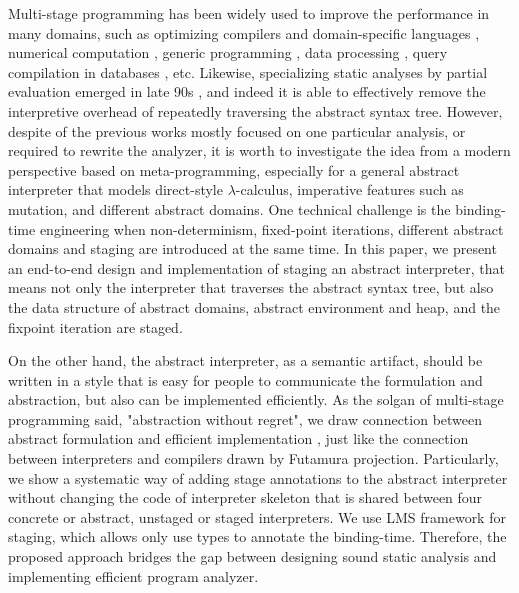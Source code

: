 Multi-stage programming has been widely used to improve the performance in many domains, 
such as optimizing compilers and domain-specific languages \cite{DBLP:conf/pldi/RompfSBLCO14, DBLP:conf/snapl/RompfBLSJAOSKDK15,
DBLP:journals/tecs/SujeethBLRCOO14, DBLP:conf/gpce/SujeethGBLROO13, DBLP:journals/jfp/CaretteKS09},
numerical computation \cite{PGL-038, DBLP:conf/pepm/AktemurKKS13}, 
generic programming \cite{DBLP:journals/pacmpl/Yallop17, Ofenbeck:2017:SGP:3136040.3136060}, 
data processing \cite{DBLP:conf/oopsla/JonnalageddaCSRO14, DBLP:conf/popl/KiselyovBPS17}, 
query compilation in databases \cite{DBLP:conf/osdi/EssertelTDBOR18, DBLP:conf/sigmod/TahboubER18},
etc.
Likewise, specializing static analyses by partial evaluation emerged in late 90s 
\cite{damian1999partial, amtoft1999partial, Boucher:1996:ACN:647473.727587, ashley:practical}, 
and indeed it is able to effectively remove the interpretive overhead of 
repeatedly traversing the abstract syntax tree. 
However, despite of the previous works mostly focused on one particular analysis,
or required to rewrite the analyzer,
it is worth to investigate the idea from a modern perspective based on meta-programming,
especially for a general abstract interpreter that models direct-style $\lambda$-calculus, imperative 
features such as mutation, and different abstract domains.
One technical challenge is the binding-time engineering when non-determinism, 
fixed-point iterations, different abstract domains and staging are introduced at the same time.
In this paper, we present an end-to-end design and implementation of staging an abstract interpreter,
that means not only the interpreter that traverses the abstract syntax tree, 
but also the data structure of abstract domains, abstract environment and heap, 
and the fixpoint iteration are staged.

On the other hand, the abstract interpreter, as a semantic artifact, should be written in a 
style that is easy for people to communicate the formulation and abstraction, but also can be implemented 
efficiently. As the solgan of multi-stage programming said, "abstraction without regret",
we draw connection between abstract formulation and efficient implementation ,
just like the connection between interpreters and compilers drawn by Futamura projection.
Particularly, we show a systematic way of adding stage annotations to the abstract interpreter
without changing the code of interpreter skeleton that is shared between four concrete or abstract,
unstaged or staged interpreters. We use LMS framework for staging, which allows only use types to 
annotate the binding-time. Therefore, the proposed approach bridges the gap between designing sound 
static analysis and implementing efficient program analyzer.

